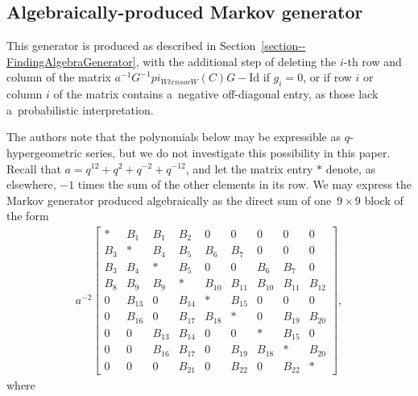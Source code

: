 \documentclass[10pt,a4paper]{amsart}
\numberwithin{equation}{section}
\theoremstyle{definition}
\def\pi{pi}
\def\otimes{ tensor }
\begin{document}
\subsection{Algebraically-produced Markov generator} \label{subsection-MarkovGen}
This generator is produced as described in Section~\ref{section--FindingAlgebraGenerator}, with the additional step of deleting the $i$-th row and column of the matrix $a^{-1}G^{-1}\pi_{W \otimes W}(C)G - \textrm{Id}$ if $g_i = 0$, or if row $i$ or column $i$ of the matrix contains a~negative off-diagonal entry, as those lack a~probabilistic interpretation.

The authors note that the polynomials below may be expressible as $q$-hypergeometric series, but we do not investigate this possibility in this paper. Recall that $a = q^{12} + q^2 + q^{-2} + q^{-12}$, and let the matrix entry $*$ denote, as elsewhere, $-1$ times the sum of the other elements in its row. We may express the Markov generator produced algebraically as the direct sum of one~${9 \times 9}$ block of the form
\begin{align*}
 a^{-2} \begin{bmatrix}
 * & B_1 & B_1 & B_2 & 0 & 0 & 0 & 0 & 0 \\
 B_3 & * & B_4 & B_5 & B_6 & B_7 & 0 & 0 & 0 \\
 B_3 & B_4 & * & B_5 & 0 & 0 & B_6 & B_7 & 0 \\
 B_8 & B_9 & B_9 & * & B_{10} & B_{11} & B_{10} & B_{11} & B_{12} \\
 0 & B_{13} & 0 & B_{14} & * & B_{15} & 0 & 0 & 0 \\
 0 & B_{16} & 0 & B_{17} & B_{18} & * & 0 & B_{19} & B_{20} \\
 0 & 0 & B_{13} & B_{14} & 0 & 0 & * & B_{15} & 0 \\
 0 & 0 & B_{16} & B_{17} & 0 & B_{19} & B_{18} & * & B_{20} \\
 0 & 0 & 0 & B_{21} & 0 & B_{22} & 0 & B_{22} & *
 \end{bmatrix},
\end{align*}
where
\end{document}
